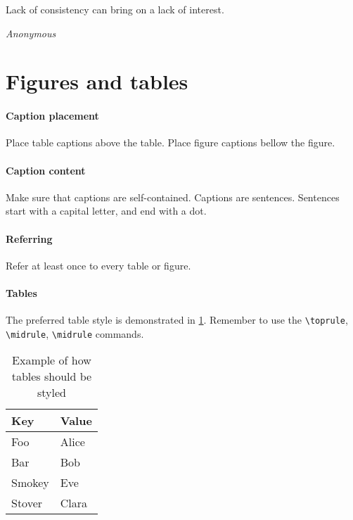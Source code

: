\epigraph{Lack of consistency can bring on a lack of interest.}{\textit{Anonymous}}
\section{Figures and tables}

\paragraph{Caption placement}
Place table captions above the table.
Place figure captions bellow the figure.

\paragraph{Caption content}
Make sure that captions are self-contained.
Captions are sentences.
Sentences start with a capital letter, and end with a dot.

\paragraph{Referring}
Refer at least once to every table or figure.

\paragraph{Tables}
The preferred table style is demonstrated in \cref{tab:defaulttable}.
Remember to use the \verb|\toprule|, \verb|\midrule|, \verb|\midrule| commands.

\begin{table}[H]
    \begin{center}
    \caption{Example of how tables should be styled}
    \label{tab:defaulttable}
    \begin{tabular}{ll}
    \toprule
    Key & Value \\ \midrule
    Foo & Alice \\
    Bar & Bob \\
    Smokey & Eve \\
    Stover & Clara \\ \bottomrule
    \end{tabular}
    \end{center}
\end{table}